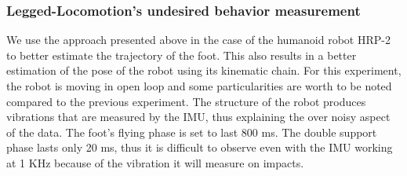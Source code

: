
\subsubsection{Legged-Locomotion's undesired behavior measurement}

We use the approach presented above in the case of the humanoid robot HRP-2 to better estimate the trajectory of the foot. This also results in a better estimation of the pose of the robot using its kinematic chain. 
For this experiment, the robot is moving in open loop and some particularities are worth to be noted compared to the previous experiment. 
The structure of the robot produces vibrations that are measured by the IMU, thus explaining the over noisy aspect of the data. The foot's flying phase is set to last 800 ms. The double support phase lasts only 20 ms, thus it is difficult to observe
even with the IMU working at 1 KHz because of the vibration it will measure on impacts.






